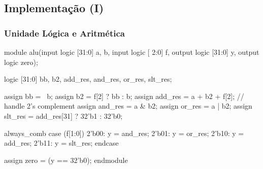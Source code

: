 
\subsection{Implementação (I)} 

\begin{frame}[fragile]
	\frametitle{Unidade Lógica e Aritmética}
	\begin{verilogcode}
module alu(input  logic [31:0] a, b,
           input  logic [ 2:0]  f,
           output logic [31:0] y,
           output logic zero);
           
  logic [31:0] bb, b2, add_res, and_res, or_res, slt_res;
  
  assign bb = ~b;
  assign b2 = f[2] ? bb : b;
  assign add_res = a + b2 + f[2]; // handle 2's complement
  assign and_res = a & b2;
  assign or_res  = a | b2;
  assign slt_res = add_res[31] ? 32'b1 : 32'b0;
  
  always_comb
    case (f[1:0])
      2'b00: y = and_res;
      2'b01: y = or_res;
      2'b10: y = add_res;
      2'b11: y = slt_res;
    endcase
    
  assign zero = (y == 32'b0);
endmodule
    \end{verilogcode} 
\end{frame}


